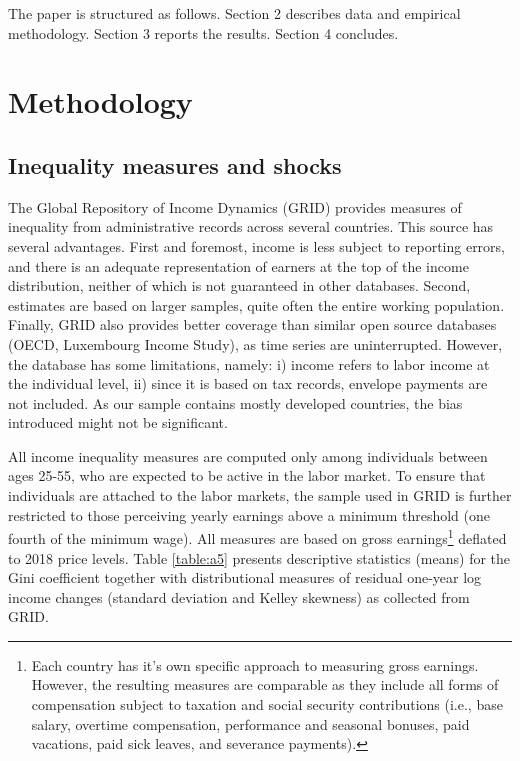 \documentclass[12pt, a4paper]{article}
\begin{document}
The paper is structured as follows. Section 2 describes data and empirical methodology. Section 3 reports the results. Section 4 concludes.


\section{Methodology}

\subsection{Inequality measures and shocks} 
The Global Repository of Income Dynamics (GRID) provides measures of inequality from administrative records across several countries. This source has several advantages. First and foremost, income is less subject to reporting errors, and there is an adequate representation of earners at the top of the income distribution, neither of which is not guaranteed in other databases. Second, estimates are based on larger samples, quite often the entire working population. Finally, GRID also provides better coverage than similar open source databases (OECD, Luxembourg Income Study), as time series are uninterrupted. However, the database has some limitations, namely: i) income refers to labor income at the individual level, ii) since it is based on tax records, envelope payments are not included. As our sample contains mostly developed countries, the bias introduced might not be significant.

All income inequality measures are computed only among individuals between ages 25-55, who are expected to be active in the labor market. To ensure that individuals are attached to the labor markets, the sample used in GRID is further restricted to those perceiving yearly earnings above a minimum threshold (one fourth of the minimum wage). All measures are based on gross earnings\footnote{Each country has it's own specific approach to measuring gross earnings. However, the resulting measures are comparable as they include all forms of compensation subject to taxation and social security contributions (i.e., base salary, overtime compensation, performance and seasonal bonuses, paid vacations, paid sick leaves, and severance payments).} deflated to 2018 price levels. Table \ref{table:a5} presents descriptive statistics (means) for the Gini coefficient together with distributional measures of residual one-year log income changes (standard deviation and Kelley skewness) as collected from GRID.
\end{document}
